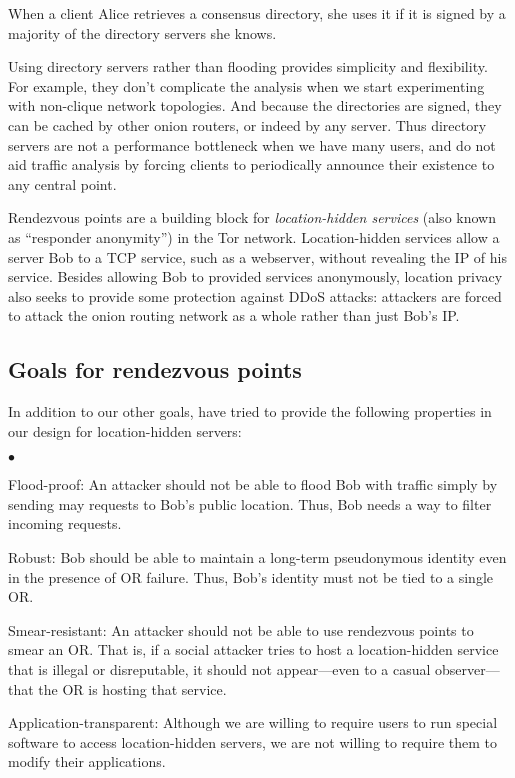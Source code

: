 \documentclass[times,10pt,twocolumn]{article}
\newenvironment{tightlist}{\begin{list}{$\bullet$}{
  \setlength{\itemsep}{0mm}
    \setlength{\parsep}{0mm}
    }}{\end{list}}
\begin{document}
When a client Alice retrieves a consensus directory, she uses it if it
is signed by a majority of the directory servers she knows.

Using directory servers rather than flooding provides simplicity and
flexibility. For example, they don't complicate the analysis when we
start experimenting with non-clique network topologies. And because
the directories are signed, they can be cached by other onion routers,
or indeed by any server.  Thus directory servers are not a performance
bottleneck when we have many users, and do not aid traffic analysis by
forcing clients to periodically announce their existence to any
central point.



\label{sec:rendezvous}

Rendezvous points are a building block for \emph{location-hidden
services} (also known as ``responder anonymity'') in the Tor
network.  Location-hidden services allow a server Bob to a TCP
service, such as a webserver, without revealing the IP of his service.
Besides allowing Bob to provided services anonymously, location
privacy also seeks to provide some protection against DDoS attacks:
attackers are forced to attack the onion routing network as a whole
rather than just Bob's IP.

\subsection{Goals for rendezvous points}
\label{subsec:rendezvous-goals}
In addition to our other goals, have tried to provide the following
properties in our design for location-hidden servers:
\begin{tightlist}
\item[Flood-proof:] An attacker should not be able to flood Bob with traffic
  simply by sending may requests to Bob's public location.  Thus, Bob needs a
  way to filter incoming requests.
\item[Robust:] Bob should be able to maintain a long-term pseudonymous
  identity even in the presence of OR failure.  Thus, Bob's identity must not
  be tied to a single OR.
\item[Smear-resistant:] An attacker should not be able to use rendezvous
  points to smear an OR.  That is, if a social attacker tries to host a 
  location-hidden service that is illegal or disreputable, it should not
  appear---even to a casual observer---that the OR is hosting that service.
\item[Application-transparent:] Although we are willing to require users to
  run special software to access location-hidden servers, we are not willing
  to require them to modify their applications.
\end{tightlist}
\end{document}
